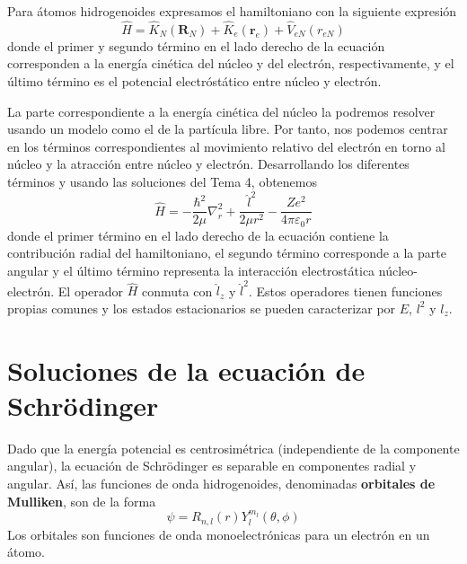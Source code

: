 Para átomos hidrogenoides expresamos el hamiltoniano con la siguiente
expresión
\begin{equation}
    \hat{H}=\hat{K}_N(\mathbf{R}_N) + \hat{K}_e(\mathbf{r}_e) + \hat{V}_{eN}(r_{eN})
\end{equation}
donde el primer y segundo término en el lado derecho de la ecuación 
corresponden a la energía cinética del núcleo y del electrón, 
respectivamente, y el último término es el potencial electróstático 
entre núcleo y electrón. 

La parte correspondiente a la energía cinética del núcleo la
podremos resolver usando un modelo como el de la partícula
libre. Por tanto, nos podemos centrar en los términos 
correspondientes al movimiento relativo del electrón en torno
al núcleo y la atracción entre núcleo y electrón. Desarrollando 
los diferentes términos y usando las soluciones del Tema 4,
obtenemos
\begin{equation}
    \hat{H}=-\frac{\hbar^2}{2\mu}\nabla_r^2+ \frac{\hat{l}^2}{2\mu r^2} - \frac{Ze^2}{4\pi \varepsilon_0r}
\end{equation}
donde el primer término en el lado derecho de la ecuación
contiene la contribución radial del hamiltoniano, el segundo 
término corresponde a la parte angular y el último término
representa la interacción electrostática núcleo-electrón.
El operador $\hat{H}$ conmuta con $\hat{l}_z$ y $\hat{l}^2$. Estos
operadores tienen funciones propias comunes y los estados estacionarios
se pueden caracterizar por $E$, $l^2$ y $l_z$. 

\section{Soluciones de la ecuación de Schrödinger}
Dado que la energía potencial es centrosimétrica (independiente
de la componente angular), la ecuación de Schrödinger es separable
en componentes radial y angular. Así, las funciones de onda
hidrogenoides, denominadas \textbf{orbitales de Mulliken}, son de la forma
\begin{equation}
    \psi=R_{n,l}(r)Y^{m_l}_l(\theta,\phi)
\end{equation}
Los orbitales son funciones de onda monoelectrónicas para un
electrón en un átomo.


